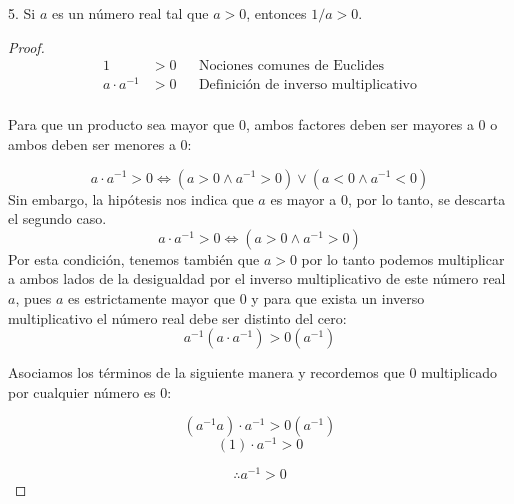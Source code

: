 \documentclass{article}
\begin{document}
{}
5. Si \(a\) es un número real tal que \(a>0\), entonces \(1/a > 0\). \\
\begin{proof}
\begin{align*}
    1 &> 0 && \text{Nociones comunes de Euclides} \\
    a \cdot a^{-1} &> 0 && \text{Definición de inverso multiplicativo} \\
\end{align*}

Para que un producto sea mayor que 0, ambos factores deben ser mayores a 0 o ambos deben ser menores a 0:

\[ a \cdot a^{-1} > 0 \iff (a > 0 \land a^{-1} > 0) \lor (a < 0 \land a^{-1} < 0) \]
Sin embargo, la hipótesis nos indica que \(a\) es mayor a 0, por lo tanto, se descarta el segundo caso.
\[ a \cdot a^{-1} > 0 \iff (a > 0 \land a^{-1} > 0) \]
Por esta condición, tenemos también que \(a > 0\) por lo tanto podemos multiplicar a ambos lados de la desigualdad por el inverso multiplicativo de este número real \(a\), pues \(a\) es estrictamente mayor que 0 y para que exista un inverso multiplicativo el número real debe ser distinto del cero:
\[ a^{-1}(a \cdot a^{-1}) > 0(a^{-1})  \]

Asociamos los términos de la siguiente manera y recordemos que 0 multiplicado por cualquier número es 0:

\[ (a^{-1}a) \cdot a^{-1} > 0(a^{-1})  \]
\[ (1) \cdot a^{-1} > 0  \]

\[ \therefore a^{-1} > 0 \]
\end{proof}
\end{document}
